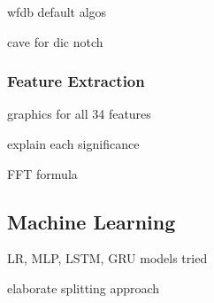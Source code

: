 wfdb default algos

cave for dic notch

\subsubsection{Feature Extraction}

graphics for all 34 features

explain each significance

FFT formula

\subsection{Machine Learning}\label{subsec:ml_methods}

LR, MLP, LSTM, GRU models tried

elaborate splitting approach

